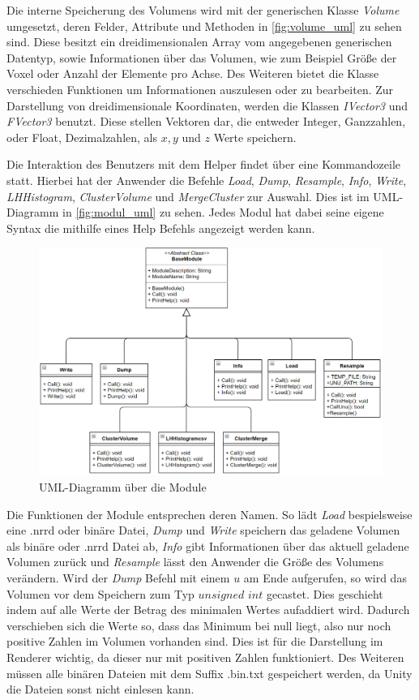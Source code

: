 Die interne Speicherung des Volumens wird mit der generischen Klasse \textit{Volume} umgesetzt, deren Felder, Attribute und Methoden in \autoref{fig:volume_uml} zu sehen sind. Diese besitzt ein dreidimensionalen Array vom angegebenen generischen Datentyp, sowie Informationen über das Volumen, wie zum Beispiel Größe der Voxel oder Anzahl der Elemente pro Achse. Des Weiteren bietet die Klasse verschieden Funktionen um Informationen auszulesen oder zu bearbeiten. Zur Darstellung von dreidimensionale Koordinaten, werden die Klassen \textit{IVector3} und \textit{FVector3} benutzt. Diese stellen Vektoren dar, die entweder Integer, Ganzzahlen, oder Float, Dezimalzahlen, als $x,y$ und $z$ Werte speichern.


Die Interaktion des Benutzers mit dem Helper findet über eine Kommandozeile statt. Hierbei hat der Anwender die Befehle \textit{Load}, \textit{Dump}, \textit{Resample}, \textit{Info}, \textit{Write}, \textit{LHHistogram}, \textit{ClusterVolume} und \textit{MergeCluster} zur Auswahl. Dies ist im UML-Diagramm in \autoref{fig:modul_uml} zu sehen. Jedes Modul hat dabei seine eigene Syntax die mithilfe eines Help Befehls angezeigt werden kann.


\begin{figure}
\centering 
\includegraphics[width=\textwidth]{Logos/Modules_UML.PNG}
\caption{UML-Diagramm über die Module} 
\label{fig:modul_uml} 
\end{figure}


Die Funktionen der Module entsprechen deren Namen. So lädt \textit{Load} bespielsweise eine .nrrd oder binäre Datei, \textit{Dump} und \textit{Write} speichern das geladene Volumen als binäre oder .nrrd Datei ab, \textit{Info} gibt Informationen über das aktuell geladene Volumen zurück und \textit{Resample} lässt den Anwender die Größe des Volumens verändern.
\newline
Wird der \textit{Dump} Befehl mit einem $u$ am Ende aufgerufen, so wird das Volumen vor dem Speichern zum Typ $unsigned$ $int$ gecastet. Dies geschieht indem auf alle Werte der Betrag des minimalen Wertes aufaddiert wird. Dadurch verschieben sich die Werte so, dass das Minimum bei null liegt, also nur noch positive Zahlen im Volumen vorhanden sind. Dies ist für die Darstellung im Renderer wichtig, da dieser nur mit positiven Zahlen funktioniert. Des Weiteren müssen alle binären Dateien mit dem Suffix .bin.txt gespeichert werden, da Unity die Dateien sonst nicht einlesen kann.


